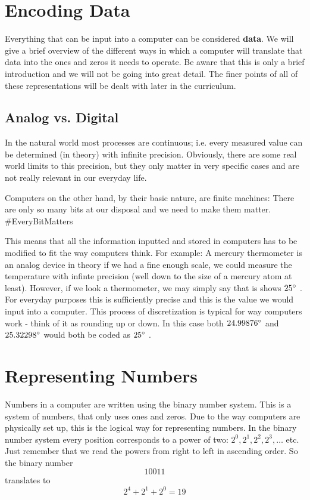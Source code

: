 \documentclass[11pt,a4paper]{report}
\newcommand{\bfb}[1]{{\bf \color{blue} #1}}
\begin{document}
\section{Encoding Data}
Everything that can be input into a computer can be considered \bfb{data}. We will give a brief overview of the different ways in which a computer will translate that data into the ones and zeros it needs to operate. Be aware that this is only a brief introduction and we will not be going into great detail. The finer points of all of these representations will be dealt with later in the curriculum.

\subsection{Analog vs. Digital}
In the natural world most processes are continuous; i.e. every measured value can be determined (in theory) with infinite precision. Obviously, there are some real world limits to this precision, but they only matter in very specific cases and are not really relevant in our everyday life.

Computers on the other hand, by their basic nature, are finite machines: There are only so many bits at our disposal and we need to make them matter. \#EveryBitMatters

This means that all the information inputted and stored in computers has to be modified to fit the way computers think. For example: A mercury thermometer is an analog device in theory if we had a fine enough scale, we could measure the temperature with infinte precision (well down to the size of a mercury atom at least). However, if we look a thermometer, we may simply say that is shows  $25^\circ$ . For everyday purposes this is sufficiently precise and this is the value we would input into a computer. This process of discretization is typical for way computers work - think of it as rounding up or down. In this case both  $24.99876^\circ$  and  $25.32298^\circ$  would both be coded as  $25^\circ$ .

\section{Representing Numbers}

Numbers in a computer are written using the binary number system. This is a system of numbers, that only uses ones and zeros. Due to the way computers are physically set up, this is the logical way for representing numbers. In the binary number system every position corresponds to a power of two:  $2^0, 2^1, 2^2, 2^3, \ldots$ etc. Just remember that we read the powers from right to left in ascending order. So the binary number
\[
10011
\]
translates to
\[
2^4+2^1+2^0=19
\]
 
\end{document}
